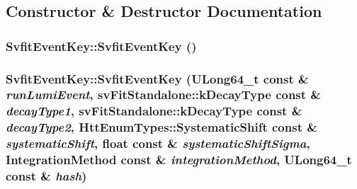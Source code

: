 \subsection{Constructor \& Destructor Documentation}
\hypertarget{classSvfitEventKey_aff668a7473d61de199fe0ceae2a5df3d}{
\subsubsection[{SvfitEventKey}]{\setlength{\rightskip}{0pt plus 5cm}SvfitEventKey::SvfitEventKey ()}}
\label{classSvfitEventKey_aff668a7473d61de199fe0ceae2a5df3d}
\hypertarget{classSvfitEventKey_a76c6b1b4c6af1e59a457958aa3528adf}{
\subsubsection[{SvfitEventKey}]{\setlength{\rightskip}{0pt plus 5cm}SvfitEventKey::SvfitEventKey (ULong64\_\-t const \& {\em runLumiEvent}, \/  svFitStandalone::kDecayType const \& {\em decayType1}, \/  svFitStandalone::kDecayType const \& {\em decayType2}, \/  {\bf HttEnumTypes::SystematicShift} const \& {\em systematicShift}, \/  float const \& {\em systematicShiftSigma}, \/  {\bf IntegrationMethod} const \& {\em integrationMethod}, \/  ULong64\_\-t const \& {\em hash})}}
\label{classSvfitEventKey_a76c6b1b4c6af1e59a457958aa3528adf}


